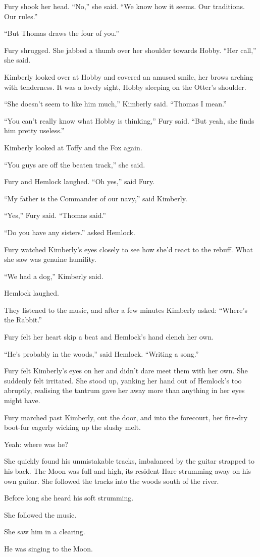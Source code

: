 \documentclass[11pt,a5paper]{article}
\begin{document}
Fury shook her head. ``No,'' she said. ``We know how it seems. Our traditions. Our rules.''

``But Thomas draws the four of you.''

Fury shrugged. She jabbed a thumb over her shoulder towards Hobby. ``Her call,'' she said.

Kimberly looked over at Hobby and covered an amused smile, her brows arching with tenderness. It was a lovely sight, Hobby sleeping on the Otter's shoulder.

``She doesn't seem to like him much,'' Kimberly said. ``Thomas I mean.''

``You can't really know what Hobby is thinking,'' Fury said. ``But yeah, she finds him pretty useless.''

Kimberly looked at Toffy and the Fox again.

``You guys are off the beaten track,'' she said.

Fury and Hemlock laughed. ``Oh yes,'' said Fury.

``My father is the Commander of our navy,'' said Kimberly.

``Yes,'' Fury said. ``Thomas said.''

``Do you have any sisters.'' asked Hemlock.

Fury watched Kimberly's eyes closely to see how she'd react to the rebuff. What she saw was genuine humility.

``We had a dog,'' Kimberly said.

Hemlock laughed.

They listened to the music, and after a few minutes Kimberly asked: ``Where's the Rabbit.''

Fury felt her heart skip a beat and Hemlock's hand clench her own.

``He's probably in the woods,'' said Hemlock. ``Writing a song.''

Fury felt Kimberly's eyes on her and didn't dare meet them with her own. She suddenly felt irritated. She stood up, yanking her hand out of Hemlock's too abruptly, realising the tantrum gave her away more than anything in her eyes might have.

Fury marched past Kimberly, out the door, and into the forecourt, her fire-dry boot-fur eagerly wicking up the slushy melt.

Yeah: where was he?

She quickly found his unmistakable tracks, imbalanced by the guitar strapped to his back. The Moon was full and high, its resident Hare strumming away on his own guitar. She followed the tracks into the woods south of the river.

Before long she heard his soft strumming.

She followed the music.

She saw him in a clearing.

He was singing to the Moon.
\end{document}
